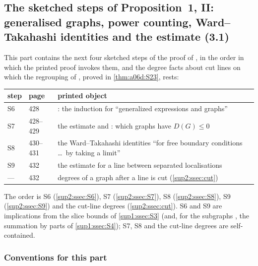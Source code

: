 
\subsection{The sketched steps of Proposition~1, II: generalised graphs, power counting, Ward--Takahashi identities and the estimate (3.1)}\label{sup2:sec}

This part contains the next four sketched steps of the proof of \cite[Prop.~1, (1.33)]{Ba3}, in the order in which the printed proof invokes them, and the degree facts about cut lines on which the regrouping of \cite[p.~432]{Ba3}, proved in \cref{thm:a06d:S23}, rests:

\begin{center}
\begin{tabular}{lll}
step & \cite{Ba3} page & printed object\\\hline
S6 & 428 & \cite[Prop.~2.2]{Ba3}: the induction \cite[(2.16)]{Ba3} for ``generalized expressions and graphs''\\
S7 & 428--429 & the estimate \cite[(2.17)]{Ba3} and \cite[Cor.~2.3]{Ba3}: which graphs have $D(G)\le0$\\
S8 & 430--431 & the Ward--Takahashi identities \cite[(2.23)--(2.28)]{Ba3} ``for free boundary conditions \dots\ by taking a limit''\\
S9 & 432 & the estimate \cite[(3.1)]{Ba3} for a line between separated localisations\\
--- & 432 & degrees of a graph after a line is cut (\cref{sup2:ssec:cut})
\end{tabular}
\end{center}

The order is S6 (\cref{sup2:ssec:S6}), S7 (\cref{sup2:ssec:S7}), S8 (\cref{sup2:ssec:S8}), S9 (\cref{sup2:ssec:S9}) and the cut-line degrees (\cref{sup2:ssec:cut}). S6 and S9 are implications from the slice bounds of \cref{sup1:ssec:S3} (and, for the subgraphs \cite[(2.4)]{Ba3}, the summation by parts of \cref{sup1:ssec:S4}); S7, S8 and the cut-line degrees are self-contained.

\subsubsection*{Conventions for this part}

